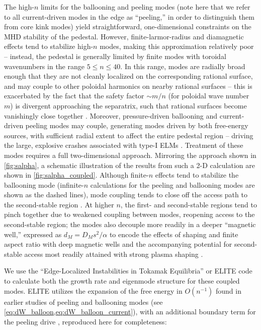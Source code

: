 The high-$n$ limits for the ballooning and peeling modes (note here that we refer to all current-driven modes in the edge as ``peeling,'' in order to distinguish them from core kink modes) yield straightforward, one-dimensional constraints on the MHD stability of the pedestal.  However, finite-larmor-radius and diamagnetic effects tend to stabilize high-$n$ modes, making this approximation relatively poor \cite{Snyder2004} -- instead, the pedestal is generally limited by finite modes with toroidal wavenumbers in the range $5 \le n \le 40$.  In this range, modes are radially broad enough that they are not cleanly localized on the corresponding rational surface, and may couple to other poloidal harmonics on nearby rational surfaces -- this is exacerbated by the fact that the safety factor $\sim m/n$ (for poloidal wave number $m$) is divergent approaching the separatrix, such that rational surfaces become vanishingly close together \cite{Connor1998a}.  Moreover, pressure-driven ballooning and current-driven peeling modes may couple, generating modes driven by both free-energy sources, with sufficient radial extent to affect the entire pedestal region -- driving the large, explosive crashes associated with type-I ELMs \cite{Wilson2002}.  Treatment of these modes requires a full two-dimensional approach.  Mirroring the approach shown in \cref{fig:salpha}, a schematic illustration of the results from such a 2-D calculation are shown in \cref{fig:salpha_coupled}.  Although finite-$n$ effects tend to stabilize the ballooning mode (infinite-$n$ calculations for the peeling and ballooning modes are shown as the dashed lines), mode coupling tends to close off the access path to the second-stable region \cite{Wilson1999}.  At higher $n$, the first- and second-stable regions tend to pinch together due to weakened coupling between modes, reopening access to the second-stable region; the modes also decouple more readily in a deeper ``magnetic well,'' expressed as $d_M = D_M s^2/\alpha$ to encode the effects of shaping and finite aspect ratio with deep magnetic wells and the accompanying potential for second-stable access most readily attained with strong plasma shaping \cite{Snyder2002}.

We use the ``Edge-Localized Instabilities in Tokamak Equilibria'' or ELITE code \cite{Wilson1999,Wilson2002,Snyder2002} to calculate both the growth rate and eigenmode structure for these coupled modes.  ELITE utilizes the expansion of the free energy in $O(n^{-1})$ found in earlier studies of peeling and ballooning modes (see \cref{eq:dW_balloon,eq:dW_balloon_current}), with an additional boundary term for the peeling drive \cite{Wilson2002,Dowsett2014}, reproduced here for completeness:

